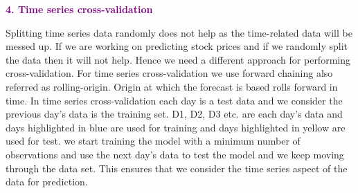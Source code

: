 \textbf{\textcolor{purple}{4. Time series cross-validation}}

Splitting time series data randomly does not help as the time-related data will be messed up.
If we are working on predicting stock prices and if we randomly split the data then it will not help. Hence we need a different approach for performing cross-validation.
For time series cross-validation we use forward chaining also referred as rolling-origin. Origin at which the forecast is based rolls forward in time.
In time series cross-validation each day is a test data and we consider the previous day’s data is the training set.
D1, D2, D3 etc. are each day’s data and days highlighted in blue are used for training and days highlighted in yellow are used for test.
we start training the model with a minimum number of observations and use the next day's data to test the model and we keep moving through the data set. This ensures that we consider the time series aspect of the data for prediction.
